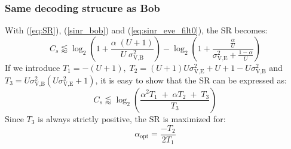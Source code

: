 \documentclass[journal,comsoc]{IEEEtran}
\begin{document}
\subsubsection{Same decoding strucure as Bob}
 With (\ref{eq:SR}), (\ref{sinr_bob}) and (\ref{eq:sinr_eve_filt0}), the SR becomes:
\begin{equation}
C_s \lessapprox \log_2 \left( 1 +  \frac{\alpha \;(U+1)}{U \; \sigma_{\text{V,B}}^2} \right) - \log_2\left( 1 + \frac{\frac{\alpha}{U}}{\sigma^2_{\text{V,E}}+\frac{1-\alpha}{U}}\right)
\label{eq:SR_anal2_decod_0}
\end{equation}
If we introduce $T_1=-(U+1),  \; T_2 = (U+1)U\sigma_{\text{V,E}}^2 + U + 1- U\sigma_{\text{V,B}}^2 $ and $T_3 = U\sigma_{\text{V,B}}^2(U\sigma_{\text{V,E}}^2+1)$, it is easy to show that the SR can be expressed as:
\begin{equation}
C_s \lessapprox \log_2 \left( \frac{\alpha^2 T_1 \; + \; \alpha T_2 \; + \; T_3}{T_3} \right)
\label{eq:SR_anal3_decod_0}
\end{equation}
Since $T_3$ is always strictly positive, the SR is maximized for:
\begin{equation}
\alpha_{\text{opt}} = \frac{-T_2}{2T_1}
\label{eq:optimal_alpha_decod_0}
\end{equation}


\end{document}

